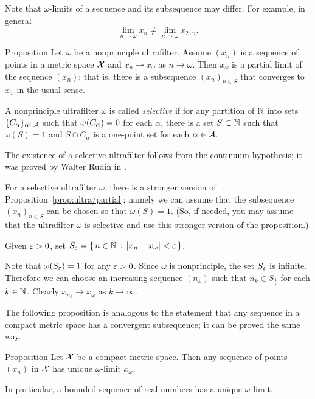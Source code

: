 Note that $\omega$-limits of a sequence and its subsequence may differ.
For example, in general
\[\lim_{n\to\omega}x_n
\ne
\lim_{n\to\omega}x_{2\cdot n}.\] 

\begin{thm}{Proposition}\label{prop:ultra/partial}
Let $\omega$ be a nonprinciple ultrafilter.
Assume $(x_n)$ is a sequence of points in a metric space $\mathcal{X}$
and $x_n\to  x_\omega$ as $n\to\omega$.
Then $x_\omega$ is a partial limit of the sequence $(x_n)$;
that is, there is a subsequence $(x_n)_{n\in S}$ that converges to $x_\omega$ in the usual sense.
\end{thm}

A nonprinciple ultrafilter $\omega$ is called 
\emph{selective} if for any partition of $\mathbb{N}$ into sets $\{C_\alpha\}_{\alpha\in\mathcal{A}}$ such that $\omega(C_\alpha)\z=0$ for each $\alpha$, 
there is a set $S\subset \mathbb{N}$ such that $\omega(S)=1$ and $S\cap C_\alpha$ is a one-point set for each $\alpha\in\mathcal{A}$.

The existence of a selective ultrafilter follows from the continuum hypothesis;
it was proved by Walter Rudin in \cite{rudin}.

For a selective ultrafilter $\omega$, there is a stronger version of Proposition~\ref{prop:ultra/partial};
namely we can assume that the subsequence $(x_n)_{n\in S}$ can be chosen so that $\omega(S)=1$.
(So, if needed, you may assume that the ultrafilter $\omega$ is selective and use this stronger version of the proposition.)

Given $\varepsilon>0$, 
set $S_\eps=\set{n\in\NN}{\dist{x_n}{x_\omega}{}<\eps}$.

Note that $\omega(S_\varepsilon)=1$ for any $\varepsilon>0$.
Since $\omega$ is nonprinciple, the set $S_\varepsilon$ is infinite.
Therefore we can choose an increasing sequence $(n_k)$
such that $n_k\in S_{\frac1k}$ for each $k\in \mathbb{N}$.
Clearly $x_{n_k}\to x_\omega$ as $k\to\infty$.
\qeds

The following proposition 
is analogous to the statement that any sequence in a compact metric space 
has a convergent subsequence;
it can be proved the same way.

\begin{thm}{Proposition}\label{prop:ultra/compact}
Let $\mathcal{X}$ be a compact metric space.
Then
any sequence of points $(x_n)$ in $\mathcal{X}$ has unique $\omega$-limit $x_\omega$.

In particular, a bounded sequence of real numbers has a unique $\omega$-limit.
\end{thm}

